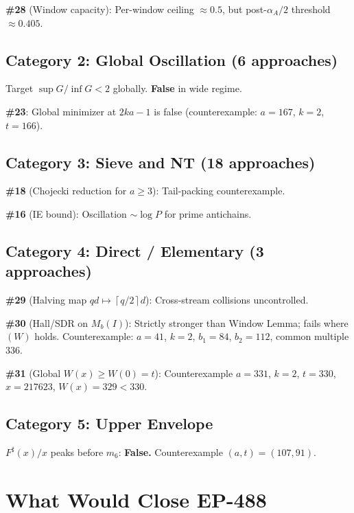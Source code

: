 \documentclass[11pt,a4paper]{article}
\theoremstyle{definition}
\newcommand{\ceil}[1]{\left\lceil #1 \right\rceil}
\begin{document}
\textbf{\#28} (Window capacity): Per-window ceiling $\approx 0.5$, but 
post-$\alpha_A/2$ threshold $\approx 0.405$.

\subsection{Category 2: Global Oscillation (6 approaches)}

Target $\sup G / \inf G < 2$ globally. \textbf{False} in wide regime.

\textbf{\#23}: Global minimizer at $2ka-1$ is false 
(counterexample: $a=167$, $k=2$, $t=166$).

\subsection{Category 3: Sieve and NT (18 approaches)}

\textbf{\#18} (Chojecki reduction for $a \geq 3$): Tail-packing counterexample.

\textbf{\#16} (IE bound): Oscillation $\sim \log P$ for prime antichains.

\subsection{Category 4: Direct / Elementary (3 approaches)}

\textbf{\#29} (Halving map $qd \mapsto \ceil{q/2}d$): Cross-stream 
collisions uncontrolled.

\textbf{\#30} (Hall/SDR on $M_b(I)$): Strictly stronger than Window 
Lemma; fails where $(W)$ holds. Counterexample: $a=41$, $k=2$, 
$b_1=84$, $b_2=112$, common multiple $336$.

\textbf{\#31} (Global $W(x) \geq W(0) = t$): Counterexample 
$a=331$, $k=2$, $t=330$, $x=217623$, $W(x) = 329 < 330$.

\subsection{Category 5: Upper Envelope}

$F^{\sharp}(x)/x$ peaks before $m_6$: \textbf{False.} 
Counterexample $(a,t) = (107,91)$.

\section{What Would Close EP-488}
\end{document}

